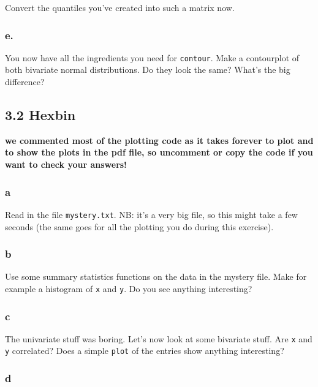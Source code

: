 \documentclass[]{article}
\begin{document}
Convert the quantiles you've created into such a matrix now.

\hypertarget{e.}{%
\subsubsection{e.}\label{e.}}

You now have all the ingredients you need for \texttt{contour}. Make a
contourplot of both bivariate normal distributions. Do they look the
same? What's the big difference?

\hypertarget{hexbin}{%
\subsection{3.2 Hexbin}\label{hexbin}}

\textbf{we commented most of the plotting code as it takes forever to
plot and to show the plots in the pdf file, so uncomment or copy the
code if you want to check your answers!}

\hypertarget{a-9}{%
\subsubsection{a}\label{a-9}}

Read in the file \texttt{mystery.txt}. NB: it's a very big file, so this
might take a few seconds (the same goes for all the plotting you do
during this exercise).

\hypertarget{b-9}{%
\subsubsection{b}\label{b-9}}

Use some summary statistics functions on the data in the mystery file.
Make for example a histogram of \texttt{x} and \texttt{y}. Do you see
anything interesting?

\hypertarget{c-9}{%
\subsubsection{c}\label{c-9}}

The univariate stuff was boring. Let's now look at some bivariate stuff.
Are \texttt{x} and \texttt{y} correlated? Does a simple \texttt{plot} of
the entries show anything interesting?

\hypertarget{d-6}{%
\subsubsection{d}\label{d-6}}
\end{document}
